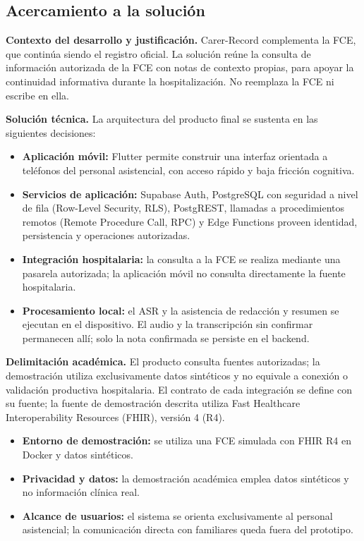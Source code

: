 \subsection{Acercamiento a la solución}

\textbf{Contexto del desarrollo y justificación.} Carer-Record complementa la FCE, que continúa siendo el registro oficial. La solución reúne la consulta de información autorizada de la FCE con notas de contexto propias, para apoyar la continuidad informativa durante la hospitalización. No reemplaza la FCE ni escribe en ella.

\textbf{Solución técnica.} La arquitectura del producto final se sustenta en las siguientes decisiones:

\begin{itemize}
    \item \textbf{Aplicación móvil:} Flutter permite construir una interfaz orientada a teléfonos del personal asistencial, con acceso rápido y baja fricción cognitiva.
    
    \item \textbf{Servicios de aplicación:} Supabase Auth, PostgreSQL con seguridad a nivel de fila (Row-Level Security, RLS), PostgREST, llamadas a procedimientos remotos (Remote Procedure Call, RPC) y Edge Functions proveen identidad, persistencia y operaciones autorizadas.
    
    \item \textbf{Integración hospitalaria:} la consulta a la FCE se realiza mediante una pasarela autorizada; la aplicación móvil no consulta directamente la fuente hospitalaria.

    \item \textbf{Procesamiento local:} el ASR y la asistencia de redacción y resumen se ejecutan en el dispositivo. El audio y la transcripción sin confirmar permanecen allí; solo la nota confirmada se persiste en el backend.
\end{itemize}

\textbf{Delimitación académica.} El producto consulta fuentes autorizadas; la demostración utiliza exclusivamente datos sintéticos y no equivale a conexión o validación productiva hospitalaria. El contrato de cada integración se define con su fuente; la fuente de demostración descrita utiliza Fast Healthcare Interoperability Resources (FHIR), versión 4 (R4).

\begin{itemize}
    \item \textbf{Entorno de demostración:} se utiliza una FCE simulada con FHIR R4 en Docker y datos sintéticos.
    \item \textbf{Privacidad y datos:} la demostración académica emplea datos sintéticos y no información clínica real.
    \item \textbf{Alcance de usuarios:} el sistema se orienta exclusivamente al personal asistencial; la comunicación directa con familiares queda fuera del prototipo.
\end{itemize}
